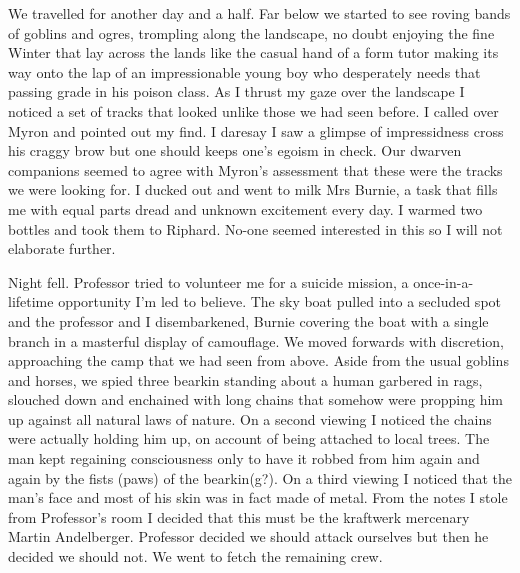 We travelled for another day and a half. Far below we started to see roving bands of goblins and ogres, trompling along the landscape, no doubt enjoying the fine Winter that lay across the lands like the casual hand of a form tutor making its way onto the lap of an impressionable young boy who desperately needs that passing grade in his poison class. As I thrust my gaze over the landscape I noticed a set of tracks that looked unlike those we had seen before. I called over Myron and pointed out my find. I daresay I saw a glimpse of impressidness cross his craggy brow but one should keeps one’s egoism in check. Our dwarven companions seemed to agree with Myron’s assessment that these were the tracks we were looking for. I ducked out and went to milk Mrs Burnie, a task that fills me with equal parts dread and unknown excitement every day. I warmed two bottles and took them to Riphard. No-one seemed interested in this so I will not elaborate further.\medskip

Night fell. Professor tried to volunteer me for a suicide mission, a once-in-a-lifetime opportunity I’m led to believe. The sky boat pulled into a secluded spot and the professor and I disembarkened, Burnie covering the boat with a single branch in a masterful display of camouflage. We moved forwards with discretion, approaching the camp that we had seen from above. Aside from the usual goblins and horses, we spied three bearkin standing about a human garbered in rags, slouched down and enchained with long chains that somehow were propping him up against all natural laws of nature. On a second viewing I noticed the chains were actually holding him up, on account of being attached to local trees. The man kept regaining consciousness only to have it robbed from him again and again by the fists (paws) of the bearkin(g?). On a third viewing I noticed that the man’s face and most of his skin was in fact made of metal. From the notes I stole from Professor’s room I decided that this must be the kraftwerk mercenary Martin Andelberger. Professor decided we should attack ourselves but then he decided we should not. We went to fetch the remaining crew.\medskip

